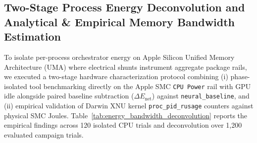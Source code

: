 \documentclass[11pt,a4paper]{article}
\begin{document}
\subsection{Two-Stage Process Energy Deconvolution and Analytical \& Empirical Memory Bandwidth Estimation}
\label{sec:energy_bandwidth_deconvolution}
To isolate per-process orchestrator energy on Apple Silicon Unified Memory Architecture (UMA) where electrical shunts instrument aggregate package rails, we executed a two-stage hardware characterization protocol combining (i) phase-isolated tool benchmarking directly on the Apple SMC \texttt{CPU Power} rail with GPU idle alongside paired baseline subtraction ($\Delta E_{\text{net}}$) against \texttt{neural\_baseline}, and (ii) empirical validation of Darwin XNU kernel \texttt{proc\_pid\_rusage} counters against physical SMC Joules. Table~\ref{tab:energy_bandwidth_deconvolution} reports the empirical findings across 120 isolated CPU trials and deconvolution over 1,200 evaluated campaign trials.


\end{document}

